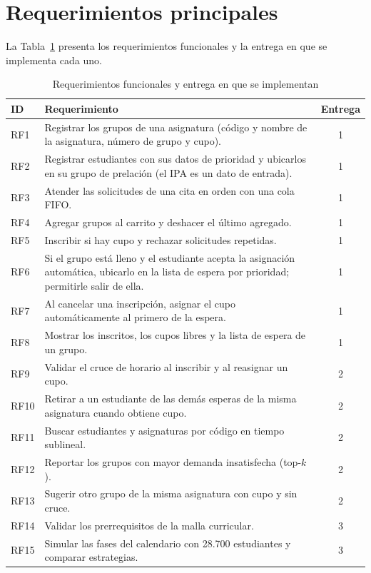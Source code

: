 \documentclass[conference]{IEEEtran}
\begin{document}

\section{Requerimientos principales}

La Tabla~\ref{tab:rf} presenta los requerimientos funcionales y la entrega en que se implementa cada uno.

\begin{table}[htbp]
\caption{Requerimientos funcionales y entrega en que se implementan}
\label{tab:rf}
\centering
\footnotesize
\begin{tabular}{@{}l p{5.4cm} c@{}}
\toprule
\textbf{ID} & \textbf{Requerimiento} & \textbf{Entrega} \\
\midrule
RF1 & Registrar los grupos de una asignatura (código y nombre de la asignatura, número de grupo y cupo). & 1 \\
RF2 & Registrar estudiantes con sus datos de prioridad y ubicarlos en su grupo de prelación (el IPA es un dato de entrada). & 1 \\
RF3 & Atender las solicitudes de una cita en orden con una cola FIFO. & 1 \\
RF4 & Agregar grupos al carrito y deshacer el último agregado. & 1 \\
RF5 & Inscribir si hay cupo y rechazar solicitudes repetidas. & 1 \\
RF6 & Si el grupo está lleno y el estudiante acepta la asignación automática, ubicarlo en la lista de espera por prioridad; permitirle salir de ella. & 1 \\
RF7 & Al cancelar una inscripción, asignar el cupo automáticamente al primero de la espera. & 1 \\
RF8 & Mostrar los inscritos, los cupos libres y la lista de espera de un grupo. & 1 \\
RF9 & Validar el cruce de horario al inscribir y al reasignar un cupo. & 2 \\
RF10 & Retirar a un estudiante de las demás esperas de la misma asignatura cuando obtiene cupo. & 2 \\
RF11 & Buscar estudiantes y asignaturas por código en tiempo sublineal. & 2 \\
RF12 & Reportar los grupos con mayor demanda insatisfecha (top-$k$). & 2 \\
RF13 & Sugerir otro grupo de la misma asignatura con cupo y sin cruce. & 2 \\
RF14 & Validar los prerrequisitos de la malla curricular. & 3 \\
RF15 & Simular las fases del calendario con 28.700 estudiantes y comparar estrategias. & 3 \\
\bottomrule
\end{tabular}
\end{table}
\end{document}
